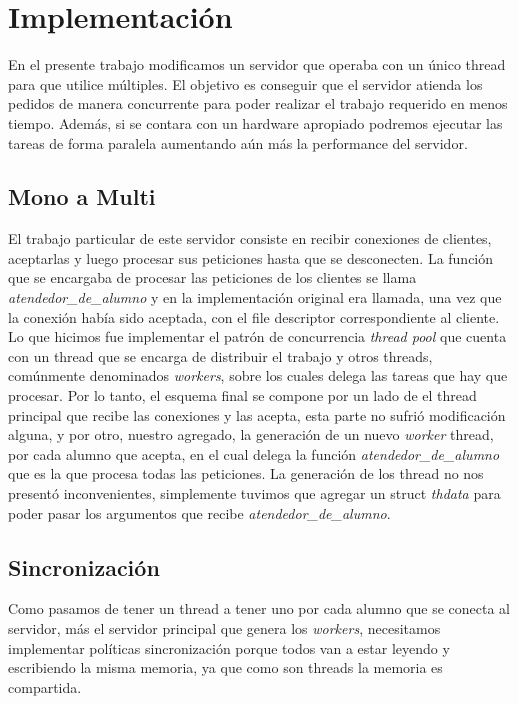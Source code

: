 \section{Implementación}
En el presente trabajo modificamos un servidor que operaba con un único thread para que
utilice múltiples. El objetivo es conseguir que el servidor atienda los pedidos de manera 
concurrente para poder realizar el trabajo requerido en menos tiempo. Además,
si se contara con un hardware apropiado podremos ejecutar las tareas de forma paralela
aumentando aún más la performance del servidor.

\subsection{Mono a Multi}
El trabajo particular de este servidor consiste en recibir conexiones de clientes, aceptarlas
y luego procesar sus peticiones hasta que se desconecten. La función que se encargaba
de procesar las peticiones de los clientes se llama \textit{atendedor\_de\_alumno} y en la
implementación original era llamada, una vez que la conexión había sido aceptada, con el
file descriptor correspondiente al cliente. Lo que hicimos fue implementar el patrón de 
concurrencia \textit{thread pool} que cuenta con un thread que se encarga de distribuir el 
trabajo y otros threads, comúnmente denominados \textit{workers}, sobre los cuales delega
las tareas que hay que procesar. Por lo tanto, el esquema final se compone por un lado 
de el thread principal que recibe las conexiones y las acepta, esta parte no sufrió 
modificación alguna, y por otro, nuestro agregado, la generación de un nuevo \textit{worker} 
thread, por cada alumno que acepta, en el cual delega la función \textit{atendedor\_de\_alumno}
que es la que procesa todas las peticiones. La generación de los thread no nos presentó
inconvenientes, simplemente tuvimos que agregar un struct \textit{thdata} para poder
pasar los argumentos que recibe \textit{atendedor\_de\_alumno}.


\subsection{Sincronización}
Como pasamos de tener un thread a tener uno por cada alumno que se conecta al servidor, más el
servidor principal que genera los \textit{workers}, necesitamos implementar políticas 
sincronización porque todos van a estar leyendo y escribiendo la misma memoria, ya que como 
son threads la memoria es compartida.

